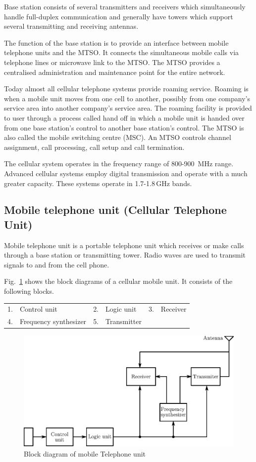 Base station consists of several transmitters and receivers which simultaneously handle full-duplex communication and generally have towers which support several transmitting and receiving antennas.

The function of the base station is to provide an interface between mobile telephone units and the MTSO. It connects the simultaneous mobile calls via telephone lines or microwave link to the MTSO. The MTSO provides a centralised administration and maintenance point for the entire network.

Today almost all cellular telephone systems provide roaming service. Roaming is when a mobile unit moves from one cell to another, possibly from one company's service area into another company's service area. The roaming facility is provided to user through a process called hand off in which a mobile unit is handed over from one base station's control to another base station's control. The MTSO is also called the mobile switching centre (MSC). An MTSO controls channel assignment, call processing, call setup and call termination.

The cellular system operates in the frequency range of 800-900 \,MHz range. Advanced cellular systems employ digital transmission and operate with a much greater capacity. These systems operate in 1.7-1.8\,GHz bands.

\subsection{Mobile telephone unit (Cellular Telephone Unit)}\label{sec10.3.1}

Mobile telephone unit is a portable telephone unit which receives or make calls through a base station or transmitting tower. Radio waves are used to transmit signals to and from the cell phone.

Fig.~\ref{fig10.5} shows the block diagrams of a cellular mobile unit. It consists of the following blocks.
\begin{center}
\begin{tabular}{r@{\;\,}l@{\qquad\qquad}r@{\;\,}l@{\qquad\qquad}r@{\;\,}l}
1. & Control unit & 2. & Logic unit & 3. & Receiver\\[4pt]
4. & Frequency synthesizer & 5. & Transmitter
\end{tabular}
\end{center}
\begin{figure}[H]
\centering
\includegraphics{chap10/fig10.5.eps}
\caption{Block diagram of mobile Telephone unit}\label{fig10.5}
\end{figure}

